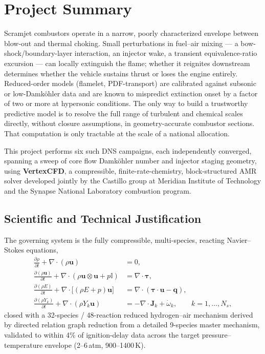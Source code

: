 \documentclass[11pt,a4paper]{scrartcl}
\begin{document}
\section{Project Summary}
Scramjet combustors operate in a narrow, poorly characterized envelope between blow-out and thermal choking. Small perturbations in fuel--air mixing --- a bow-shock/boundary-layer interaction, an injector wake, a transient equivalence-ratio excursion --- can locally extinguish the flame; whether it reignites downstream determines whether the vehicle sustains thrust or loses the engine entirely. Reduced-order models (flamelet, PDF-transport) are calibrated against subsonic or low-Damk\"ohler data and are known to mispredict extinction onset by a factor of two or more at hypersonic conditions. The only way to build a trustworthy predictive model is to resolve the full range of turbulent and chemical scales directly, without closure assumptions, in geometry-accurate combustor sections. That computation is only tractable at the scale of a national allocation.

This project performs six such DNS campaigns, each independently converged, spanning a sweep of core flow Damk\"ohler number and injector staging geometry, using \textbf{VertexCFD}, a compressible, finite-rate-chemistry, block-structured AMR solver developed jointly by the Castillo group at Meridian Institute of Technology and the Synapse National Laboratory combustion program.

\subsection{Scientific and Technical Justification}
The governing system is the fully compressible, multi-species, reacting Navier--Stokes equations,
\begin{align}
\frac{\partial \rho}{\partial t} + \nabla\cdot(\rho \mathbf{u}) &= 0, \\
\frac{\partial (\rho \mathbf{u})}{\partial t} + \nabla\cdot(\rho \mathbf{u}\otimes\mathbf{u} + p\mathbb{I}) &= \nabla\cdot\boldsymbol{\tau}, \\
\frac{\partial (\rho E)}{\partial t} + \nabla\cdot\big[(\rho E + p)\mathbf{u}\big] &= \nabla\cdot(\boldsymbol{\tau}\cdot\mathbf{u} - \mathbf{q}), \\
\frac{\partial (\rho Y_k)}{\partial t} + \nabla\cdot(\rho Y_k \mathbf{u}) &= -\nabla\cdot\mathbf{J}_k + \dot{\omega}_k, \qquad k = 1,\ldots,N_s,
\end{align}
closed with a 32-species / 48-reaction reduced hydrogen--air mechanism derived by directed relation graph reduction from a detailed 9-species master mechanism, validated to within 4\% of ignition-delay data across the target pressure--temperature envelope (2--6\,atm, 900--1400\,K).
\end{document}
